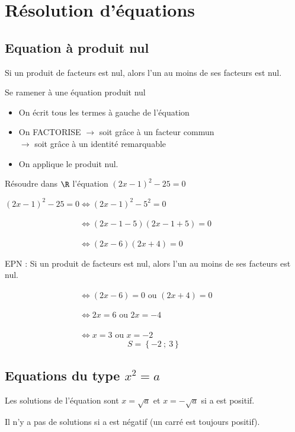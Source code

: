 \documentclass[11pt,a4paper]{book}
\begin{document}
\section{Résolution d'équations}

\subsection{Equation à produit nul}
\begin{bprop}
	Si un produit de facteurs est nul, alors l'un au moins de ses facteurs est nul.
\end{bprop}
\begin{bmethodet}{Se ramener à une équation produit nul}
	\renewcommand{\labelitemi}{\tiny$\bullet$}
	\begin{itemize}
		\item On écrit tous les termes à gauche de l'équation
		\item On FACTORISE $\rightarrow$ soit grâce à un facteur commun\\
		\phantom { On FACTORISE}$\rightarrow$ soit grâce à un identité remarquable
		\item On applique le produit nul.
		
	\end{itemize}
\end{bmethodet}

\begin{bexemple}{}
	Résoudre dans $\R$ l'équation $(2x-1)^2-25= 0$
	
	$(2x-1)^2-25= 0 \iff (2x-1)^2-5^2=0$
	
	$\phantom{(2x-1)^2-25= 0 } \iff (2x-1-5)(2x-1+5)=0$
	
	$\phantom{(2x-1)^2-25= 0 } \iff (2x-6)(2x+4)=0$
	
	EPN : Si un produit de facteurs est nul, alors l'un au moins de ses facteurs est nul.
	
	$\phantom{(2x-1)^2-25= 0 } \iff (2x-6)=0$ ou $(2x+4)=0$
	
	$\phantom{(2x-1)^2-25= 0 } \iff 2x=6$ ou $2x=-4$
	
	$\phantom{(2x-1)^2-25= 0 } \iff x=3$ ou $x=-2$
	$$S=\left\{-2\ ;\ 3\right\}$$
	
\end{bexemple}

\subsection{Equations du type $x^2=a$}

\begin{bmethode}
	Les solutions de l'équation sont $x=\sqrt{a}$ et $x=-\sqrt{a}$ si a est positif.
	
	Il n'y a pas de solutions si a est négatif (un carré est toujours positif).
\end{bmethode}
\end{document}
